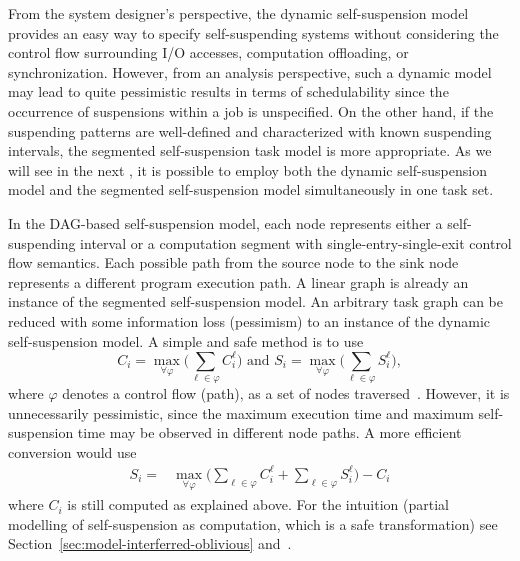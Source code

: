 From the system designer's perspective, the dynamic self-suspension model provides an easy way to specify self-suspending systems 
without considering the control flow surrounding I/O accesses, computation offloading, or synchronization. However, from an analysis perspective, such a 
dynamic model may lead to quite pessimistic results in terms of schedulability since the occurrence of suspensions within a job is 
unspecified. On the other hand, if the suspending patterns are well-defined and characterized with known suspending intervals, the 
segmented self-suspension task model is more appropriate.   
As we will see in the next \mysectionrefnormal{}, it is possible to employ both the dynamic self-suspension model and the segmented self-suspension model simultaneously 
in one task set.




In the DAG-based self-suspension model\cite{bletsas:thesis}, each node represents either a self-suspending interval or a computation segment
with single-entry-single-exit control flow semantics. Each possible path from the source node to the sink node
represents a different program execution path. A linear graph is already an instance of the segmented self-suspension model.
An arbitrary task graph can be reduced with some information loss (pessimism) to an instance of the dynamic self-suspension model. 
%
%
%
A simple and safe method is to use
\begin{equation*} 
C_i =  \max_{\forall \varphi} \Big(  \sum_{\ell \in \varphi} C_i^\ell   \Big)        \mbox{   and }
S_i =  \max_{\forall \varphi} \Big(  \sum_{\ell \in \varphi} S_i^\ell   \Big),
\end{equation*}
where $\varphi$ denotes a control flow (path), as a set of nodes traversed~\cite{RTAS-AudsleyB04,bletsas:thesis}. However, it is unnecessarily pessimistic, since the maximum execution time and maximum self-suspension 
time may be observed in different node paths. A more efficient conversion would use
\begin{align} 
S_i =  &\max_{\forall \varphi} \Big(  \sum_{\ell \in \varphi} C_i^\ell + \sum_{\ell \in \varphi} S_i^\ell   \Big)  - C_i  \nonumber
\end{align}
where $C_i$ is still computed as explained above. For the intuition (partial modelling of self-suspension as computation, which is a safe transformation) 
see Section~\ref{sec:model-interferred-oblivious} and~\cite{RTAS-AudsleyB04,BletsasReport2015}.

